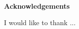 \begin{center}
		{\Large \bfseries Acknowledgements}\\
\end{center}

\justify
	
	I would like to thank ...


